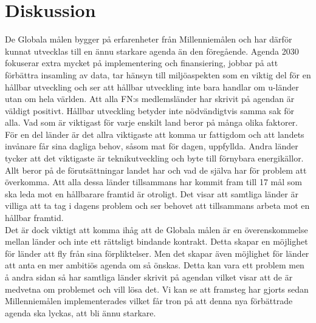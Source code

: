 \documentclass{report}
\begin{document}
\section{Diskussion}
De Globala målen bygger på erfarenheter från Millenniemålen och har därför kunnat utvecklas till en ännu starkare agenda än den föregående. Agenda 2030 fokuserar extra mycket på implementering och finansiering, jobbar på att förbättra insamling av data, tar hänsyn till miljöaspekten som en viktig del för en hållbar utveckling och ser att hållbar utveckling inte bara handlar om u-länder utan om hela världen. Att alla FN:s medlemsländer har skrivit på agendan är väldigt positivt. Hållbar utveckling betyder inte nödvändigtvis samma sak för alla. Vad som är viktigast för varje enskilt land beror på många olika faktorer. För en del länder är det allra viktigaste att komma ur fattigdom och att landets invånare får sina dagliga behov, såsom mat för dagen, uppfyllda. Andra länder tycker att det viktigaste är teknikutveckling och byte till förnybara energikällor. Allt beror på de förutsättningar landet har och vad de själva har för problem att överkomma. Att alla dessa länder tillsammans har kommit fram till 17 mål som ska leda mot en hållbarare framtid är otroligt. Det visar att samtliga länder är villiga att ta tag i dagens problem och ser behovet att tillsammans arbeta mot en hållbar framtid. \\

Det är dock viktigt att komma ihåg att de Globala målen är en överenskommelse mellan länder och inte ett rättsligt bindande kontrakt. Detta skapar en möjlighet för länder att fly från sina förpliktelser. Men det skapar även möjlighet för länder att anta en mer ambitiös agenda om så önskas. Detta kan vara ett problem men å andra sidan så har samtliga länder skrivit på agendan vilket visar att de är medvetna om problemet och vill lösa det.  Vi kan se att framsteg har gjorts sedan Millenniemålen implementerades vilket får tron på att denna nya förbättrade agenda ska lyckas, att bli ännu starkare. \\
\end{document}
